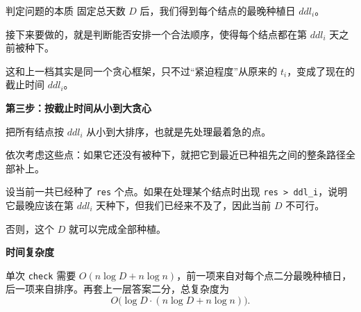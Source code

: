 \documentclass{book}
\newcommand{\code}[1]{\colorbox{codebg}{\texttt{#1}}}  %
\begin{document}
    \begin{keybox}{判定问题的本质}
        固定总天数 $D$ 后，我们得到每个结点的最晚种植日 $ddl_i$。

        接下来要做的，就是判断能否安排一个合法顺序，使得每个结点都在第 $ddl_i$ 天之前被种下。

        这和上一档其实是同一个贪心框架，只不过“紧迫程度”从原来的 $t_i$，变成了现在的截止时间 $ddl_i$。
    \end{keybox}

\par\medskip
\noindent\textbf{第三步：按截止时间从小到大贪心}
\par\medskip

    把所有结点按 $ddl_i$ 从小到大排序，也就是先处理最着急的点。

    依次考虑这些点：如果它还没有被种下，就把它到最近已种祖先之间的整条路径全部补上。

    设当前一共已经种了 \code{res} 个点。如果在处理某个结点时出现 \code{res > ddl\_i}，说明它最晚应该在第 $ddl_i$ 天种下，但我们已经来不及了，因此当前 $D$ 不可行。

    否则，这个 $D$ 就可以完成全部种植。

\par\medskip
\noindent\textbf{时间复杂度}
\par\medskip
    单次 \code{check} 需要 $O(n \log D + n \log n)$，前一项来自对每个点二分最晚种植日，后一项来自排序。再套上一层答案二分，总复杂度为
    \[
    O\bigl(\log D \cdot (n \log D + n \log n)\bigr).
    \]
\end{document}

